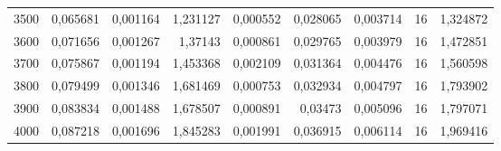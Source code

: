 \begin{tabular}{r r r r r r r r r}
3500 & 0,065681 & 0,001164 & 1,231127 & 0,000552 & 0,028065 & 0,003714 & 16 & 1,324872 \\
3600 & 0,071656 & 0,001267 & 1,37143 & 0,000861 & 0,029765 & 0,003979 & 16 & 1,472851 \\
3700 & 0,075867 & 0,001194 & 1,453368 & 0,002109 & 0,031364 & 0,004476 & 16 & 1,560598 \\
3800 & 0,079499 & 0,001346 & 1,681469 & 0,000753 & 0,032934 & 0,004797 & 16 & 1,793902 \\
3900 & 0,083834 & 0,001488 & 1,678507 & 0,000891 & 0,03473 & 0,005096 & 16 & 1,797071 \\
4000 & 0,087218 & 0,001696 & 1,845283 & 0,001991 & 0,036915 & 0,006114 & 16 & 1,969416 \\
\end{tabular}